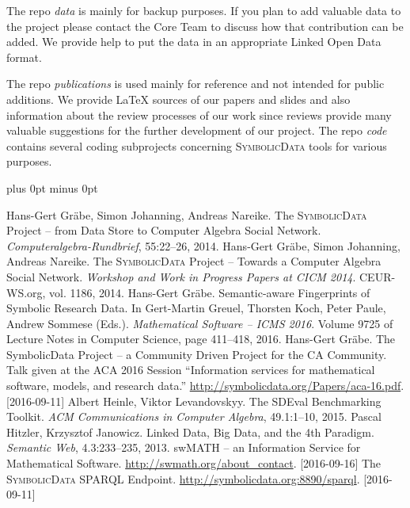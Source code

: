 \documentclass[a4paper,11pt]{article}
\def\SD{\textsc{Symbolic\-Data}}
\begin{document}
\begin{multicols}{2}
The repo \emph{data} is mainly for backup purposes. If you plan to add
valuable data to the project please contact the Core Team to discuss how that
contribution can be added. We provide help to put the data in an appropriate
Linked Open Data format.

The repo \emph{publications} is used mainly for reference and not intended for
public additions. We provide {\LaTeX} sources of our papers and slides and
also information about the review processes of our work since reviews provide
many valuable suggestions for the further development of our project.  The
repo \emph{code} contains several coding subprojects concerning {\SD} tools
for various purposes. 


\begin{thebibliography}{1}
\itemsep=0cm plus 0pt minus 0pt

 Hans-Gert Gr\"abe, Simon Johanning, Andreas Nareike.
  \newblock The {\SD} Project -- from Data Store to Computer Algebra Social
  Network. \newblock \emph{Computeralgebra-Rundbrief}, 55:22--26, 2014.
 Hans-Gert Gr\"abe, Simon Johanning, Andreas Nareike.
  \newblock The {\SD} Project -- Towards a Computer Algebra Social Network.
  \newblock \emph{Workshop and Work in Progress Papers at CICM 2014}.
  CEUR-WS.org, vol. 1186, 2014.
 Hans-Gert Gr\"abe. \newblock Semantic-aware Fingerprints of
  Symbolic Research Data. \newblock In Gert-Martin Greuel, Thorsten Koch, Peter
  Paule, Andrew Sommese (Eds.).  \emph{Mathematical Software -- ICMS 2016}.
  \newblock Volume 9725 of Lecture Notes in Computer Science, page 411--418,
  2016.  
 Hans-Gert Gr\"abe. \newblock The SymbolicData Project – a
  Community Driven Project for the CA Community.  \newblock Talk given at the
  ACA 2016 Session ``Information services for mathematical software, models,
  and research data.'' \newblock 
  \url{http://symbolicdata.org/Papers/aca-16.pdf}. [2016-09-11]
 Albert Heinle, Viktor Levandovskyy.  \newblock The SDEval
  Benchmarking Toolkit.  \newblock \emph{ACM Communications in Computer
    Algebra}, 49.1:1--10, 2015.
 Pascal Hitzler, Krzysztof Janowicz.  \newblock Linked
  Data, Big Data, and the 4th Paradigm.  \newblock \emph{Semantic Web},
  4.3:233--235, 2013.
 swMATH -- an Information Service for Mathematical Software.
  \newblock \url{http://swmath.org/about_contact}. [2016-09-16]
 The {\SD} SPARQL Endpoint. \newblock 
   \url{http://symbolicdata.org:8890/sparql}. [2016-09-11]

\end{thebibliography}


\end{multicols}
\end{document}
